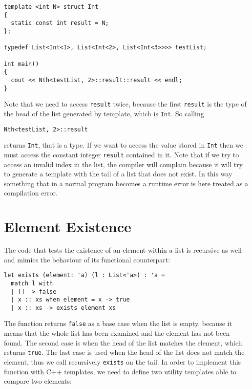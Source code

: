 \begin{lstlisting}
template <int N> struct Int 
{
  static const int result = N;
};

typedef List<Int<1>, List<Int<2>, List<Int<3>>>> testList;

int main()
{
  cout << Nth<testList, 2>::result::result << endl;
}
\end{lstlisting}

\noindent
Note that we need to access \texttt{result} twice, because the first \texttt{result} is the type of the head of the list generated by template, which is \texttt{Int}. So calling 

\begin{lstlisting}
Nth<testList, 2>::result
\end{lstlisting}

\noindent
returns \texttt{Int}, that is a type. If we want to access the value stored in \texttt{Int} then we must access the constant integer \texttt{result} contained in it. Note that if we try to access an invalid index in the list, the compiler will complain because it will try to generate a template with the tail of a list that does not exist. In this way something that in a normal program becomes a runtime error is here treated as a compilation error.

\section{Element Existence}
\label{sec:app_templates_existance}
The code that tests the existence of an element within a list is recursive as well and mimics the behaviour of its functional counterpart:

\begin{lstlisting}
let exists (element: 'a) (l : List<'a>) : 'a =
  match l with
  | [] -> false
  | x :: xs when element = x -> true
  | x :: xs -> exists element xs
\end{lstlisting}

\noindent
The function returns \texttt{false} as a base case when the list is empty, because it means that the whole list has been examined and the element has not been found. The second case is when the head of the list matches the element, which returns \texttt{true}. The last case is used when the head of the list does not match the element, thus we call recursively \texttt{exists} on the tail. In order to implement this function with C++ templates, we need to define two utility templates able to compare two elements:

